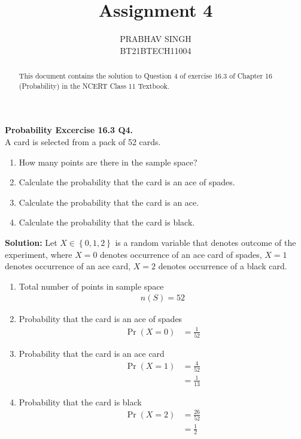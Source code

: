 \documentclass[journal,12pt,twocolumn]{IEEEtran}
\title{Assignment 4}
\author{PRABHAV SINGH\\BT21BTECH11004}
\date{}
\providecommand{\pr}[1]{\ensuremath{\Pr\left(#1\right)}}
\providecommand{\cbrak}[1]{\ensuremath{\left\{#1\right\}}}
\newcommand{\solution}{\noindent \textbf{Solution: }}
\begin{document}
	\maketitle
	\begin{abstract}
		This document contains the solution to Question 4 of exercise 16.3 of Chapter 16 (Probability) in the NCERT Class 11 Textbook.
	\end{abstract}
	
	\textbf{Probability Excercise 16.3 Q4.}\\
	A card is selected from a pack of 52 cards.
	\begin{enumerate}[label=(\roman{enumi})]
		\item How many points are there in the sample space?
		\item Calculate the probability that the card is an ace of spades.
		\item Calculate the probability that the card is an ace.
		\item Calculate the probability that the card is black.
	\end{enumerate} 
	\solution Let $X\in \cbrak{0,1,2}$ is a random variable that denotes outcome of the experiment, where $X = 0$ denotes occurrence of an ace card of spades, $X = 1$ denotes occurrence of an ace card, $X = 2$ denotes occurrence of a black card.
	\begin{enumerate}
		\item Total number of points in sample space\\
		\begin{align}
		  n(S) = 52 
		  \end{align}
		
		\item Probability that the card is an ace of spades
		\begin{align}
			\pr{X = 0} &= \frac{1}{52}
		\end{align}
		\item Probability that the card is an ace card
		\begin{align}
			\pr{X = 1} &= \frac{4}{52}\\
			&=\frac{1}{13}
		\end{align}
		\item Probability that the card is black
		\begin{align}
			\pr{X = 2} &= \frac{26}{52}\\
			&=\frac{1}{2}
		\end{align}
		
	\end{enumerate}
\end{document}
